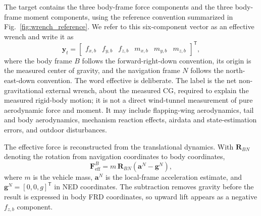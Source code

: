 The target contains the three body-frame force components and the three body-frame moment components, using the reference convention summarized in Fig.~\ref{fig:wrench_reference}. We refer to this six-component vector as an effective wrench and write it as
\begin{equation}
  \mathbf{y}_t =
  \begin{bmatrix}
  f_{x,b} & f_{y,b} & f_{z,b} & m_{x,b} & m_{y,b} & m_{z,b}
  \end{bmatrix}^{\mathsf{T}},
  \label{eq:wrench_vector}
\end{equation}
where the body frame $B$ follows the forward-right-down convention, its origin is the measured center of gravity, and the navigation frame $N$ follows the north-east-down convention. The word effective is deliberate. The label is the net non-gravitational external wrench, about the measured CG, required to explain the measured rigid-body motion; it is not a direct wind-tunnel measurement of pure aerodynamic force and moment. It may include flapping-wing aerodynamics, tail and body aerodynamics, mechanism reaction effects, airdata and state-estimation errors, and outdoor disturbances.

The effective force is reconstructed from the translational dynamics. With $\mathbf{R}_{BN}$ denoting the rotation from navigation coordinates to body coordinates,
\begin{equation}
  \mathbf{F}_{\mathrm{eff}}^{B}
  =
  m\,\mathbf{R}_{BN}
  \left(
    \mathbf{a}^{N} - \mathbf{g}^{N}
  \right),
  \label{eq:force_label}
\end{equation}
where $m$ is the vehicle mass, $\mathbf{a}^{N}$ is the local-frame acceleration estimate, and $\mathbf{g}^{N}=[0,0,g]^{\mathsf{T}}$ in NED coordinates. The subtraction removes gravity before the result is expressed in body FRD coordinates, so upward lift appears as a negative $f_{z,b}$ component.

